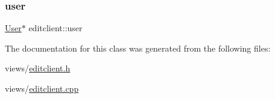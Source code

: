 \mbox{\label{classeditclient_a5945bbf29ac9a75c8a680f6623460899}} 
\subsubsection{\texorpdfstring{user}{user}}
{\footnotesize\ttfamily \hyperlink{classUser}{User}$\ast$ editclient\+::user\hspace{0.3cm}{\ttfamily [private]}}



The documentation for this class was generated from the following files\+:\begin{DoxyCompactItemize}
\item 
views/\hyperlink{editclient_8h}{editclient.\+h}\item 
views/\hyperlink{editclient_8cpp}{editclient.\+cpp}\end{DoxyCompactItemize}
